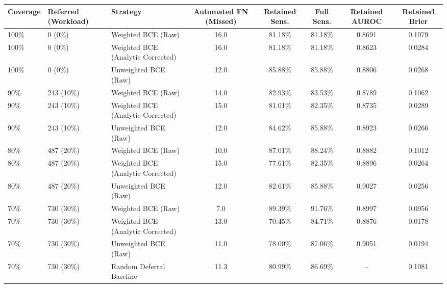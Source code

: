 \begin{tabular}{lllccccc}
\toprule
\textbf{Coverage} & \textbf{Referred (Workload)} & \textbf{Strategy} & \textbf{Automated FN (Missed)} & \textbf{Retained Sens.} & \textbf{Full Sens.} & \textbf{Retained AUROC} & \textbf{Retained Brier} \\
\midrule
100\% & 0 (0\%) & Weighted BCE (Raw) & 16.0 & 81.18\% & 81.18\% & 0.8691 & 0.1079 \\
100\% & 0 (0\%) & Weighted BCE (Analytic Corrected) & 16.0 & 81.18\% & 81.18\% & 0.8623 & 0.0284 \\
100\% & 0 (0\%) & Unweighted BCE (Raw) & 12.0 & 85.88\% & 85.88\% & 0.8806 & 0.0268 \\
\midrule
90\% & 243 (10\%) & Weighted BCE (Raw) & 14.0 & 82.93\% & 83.53\% & 0.8789 & 0.1062 \\
90\% & 243 (10\%) & Weighted BCE (Analytic Corrected) & 15.0 & 81.01\% & 82.35\% & 0.8735 & 0.0289 \\
90\% & 243 (10\%) & Unweighted BCE (Raw) & 12.0 & 84.62\% & 85.88\% & 0.8923 & 0.0266 \\
\midrule
80\% & 487 (20\%) & Weighted BCE (Raw) & 10.0 & 87.01\% & 88.24\% & 0.8882 & 0.1012 \\
80\% & 487 (20\%) & Weighted BCE (Analytic Corrected) & 15.0 & 77.61\% & 82.35\% & 0.8896 & 0.0264 \\
80\% & 487 (20\%) & Unweighted BCE (Raw) & 12.0 & 82.61\% & 85.88\% & 0.9027 & 0.0256 \\
\midrule
70\% & 730 (30\%) & Weighted BCE (Raw) & 7.0 & 89.39\% & 91.76\% & 0.8997 & 0.0956 \\
70\% & 730 (30\%) & Weighted BCE (Analytic Corrected) & 13.0 & 70.45\% & 84.71\% & 0.8876 & 0.0178 \\
70\% & 730 (30\%) & Unweighted BCE (Raw) & 11.0 & 78.00\% & 87.06\% & 0.9051 & 0.0194 \\
70\% & 730 (30\%) & Random Deferral Baseline & 11.3 & 80.99\% & 86.69\% & -- & 0.1081 \\
\bottomrule
\end{tabular}
